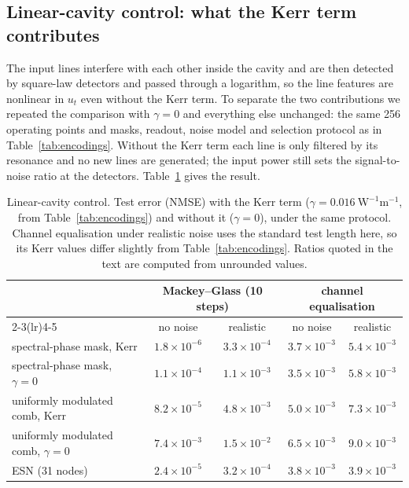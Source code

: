 \subsection{Linear-cavity control: what the Kerr term contributes}\label{sec:linear}

The input lines interfere with each other inside the cavity and are then detected by square-law detectors and passed through a
logarithm, so the line features are nonlinear in $u_t$ even without the Kerr term. To separate the two contributions we repeated the
comparison with $\gamma=0$ and everything else unchanged: the same 256 operating points and masks, readout, noise model and selection
protocol as in Table~\ref{tab:encodings}. Without the Kerr term each line is only filtered by its resonance and no new lines are
generated; the input power still sets the signal-to-noise ratio at the detectors. Table~\ref{tab:linear} gives the result.

\begin{table}[htbp]
\centering
\caption{Linear-cavity control. Test error (NMSE) with the Kerr term ($\gamma=0.016~\mathrm{W^{-1}m^{-1}}$, from
Table~\ref{tab:encodings}) and without it ($\gamma=0$), under the same protocol. Channel equalisation under realistic noise uses the
standard test length here, so its Kerr values differ slightly from Table~\ref{tab:encodings}. Ratios quoted in the text are computed
from unrounded values.}
\label{tab:linear}
\footnotesize\setlength{\tabcolsep}{4pt}
\begin{tabular}{lcccc}
\toprule
 & \multicolumn{2}{c}{Mackey--Glass (10 steps)} & \multicolumn{2}{c}{channel equalisation} \\
\cmidrule(lr){2-3}\cmidrule(lr){4-5}
 & no noise & realistic & no noise & realistic \\
\midrule
spectral-phase mask, Kerr & $1.8\times10^{-6}$ & $3.3\times10^{-4}$ & $3.7\times10^{-3}$ & $5.4\times10^{-3}$ \\
spectral-phase mask, $\gamma=0$ & $1.1\times10^{-4}$ & $1.1\times10^{-3}$ & $3.5\times10^{-3}$ & $5.8\times10^{-3}$ \\
uniformly modulated comb, Kerr & $8.2\times10^{-5}$ & $4.8\times10^{-3}$ & $5.0\times10^{-3}$ & $7.3\times10^{-3}$ \\
uniformly modulated comb, $\gamma=0$ & $7.4\times10^{-3}$ & $1.5\times10^{-2}$ & $6.5\times10^{-3}$ & $9.0\times10^{-3}$ \\
\midrule
ESN (31 nodes) & $2.4\times10^{-5}$ & $3.2\times10^{-4}$ & $3.8\times10^{-3}$ & $3.9\times10^{-3}$ \\
\bottomrule
\end{tabular}
\end{table}


